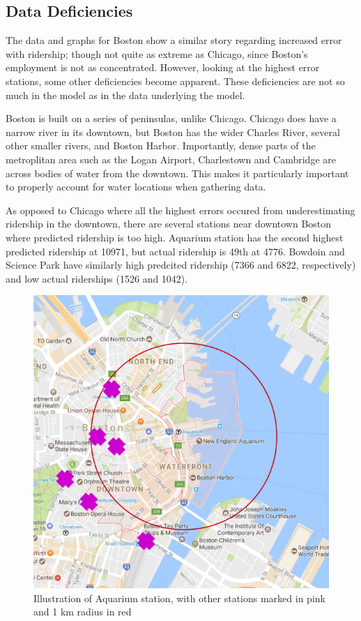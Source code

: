 \documentclass{article}
\begin{document}
\subsection{Data Deficiencies}
The data and graphs for Boston show a similar story regarding increased error with ridership; though not quite as extreme as Chicago, since Boston's employment is not as concentrated. However, looking at the highest error stations, some other deficiencies become apparent. These deficiencies are not so much in the model as in the data underlying the model.

Boston is built on a series of peninsulas, unlike Chicago. Chicago does have a narrow river in its downtown, but Boston has the wider Charles River, several other smaller rivers, and Boston Harbor. Importantly, dense parts of the metroplitan area such as the Logan Airport, Charlestown and Cambridge are across bodies of water from the downtown. This makes it particularly important to properly account for water locations when gathering data. 

As opposed to Chicago where all the highest errors occured from underestimating ridership in the downtown, there are several stations near downtown Boston where predicted ridership is too high. Aquarium station has the second highest predicted ridership at 10971, but actual ridership is 49th at 4776. Bowdoin and Science Park have similarly high predcited ridership (7366 and 6822, respectively) and low actual riderships (1526 and 1042). 

\begin{figure}[H]\label{fig:f9}
\begin{center}\includegraphics[scale=0.6]{Aquarium_with_markup}\end{center}
\caption{Illustration of Aquarium station, with other stations marked in pink and 1 km radius in red}
\end{figure}
\end{document}
